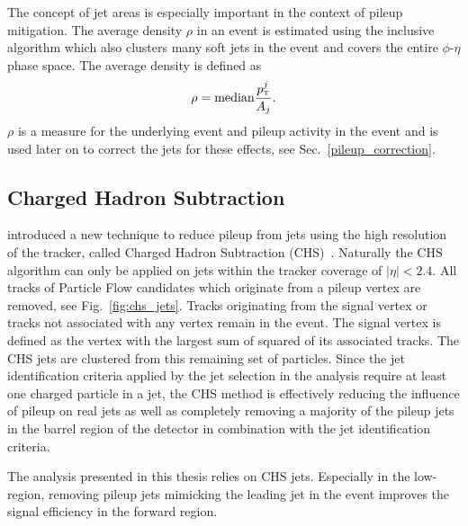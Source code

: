 The concept of jet areas is especially important in the context of pileup
mitigation. The average \pt density $\rho$ in an event is estimated using the inclusive
\kt algorithm which also clusters many soft jets in the event and covers the
entire $\phi$-$\eta$ phase space. The average \pt density is defined as
%
\begin{equation*}
    \rho = \text{median} \frac{\pt^j}{A_j}.
\end{equation*}
%
$\rho$ is a measure for the underlying event and pileup activity in the event
and is used later on to correct the jets for these effects, see
Sec.~\ref{pileup_correction}.

\subsection{Charged Hadron Subtraction}
\label{sec:chs_algorithm}

\CMS introduced a new technique to reduce pileup from jets using the high
resolution of the tracker, called Charged Hadron Subtraction
(CHS)~\cite{Kirschenmann:2014dla}. Naturally the CHS algorithm can only be
applied on jets within the tracker coverage of $|\eta| < 2.4$. All tracks of
Particle Flow candidates which originate from a pileup vertex are removed, see
Fig.~\ref{fig:chs_jets}. Tracks originating from the signal vertex or tracks not
associated with any vertex remain in the event. The signal vertex is defined as
the vertex with the largest sum of \pt squared of its associated tracks. The
CHS jets are clustered from this remaining set of particles. Since the jet
identification criteria applied by the jet selection in the analysis require at least
one charged particle in a jet, the CHS method is effectively reducing the
influence of pileup on real jets as well as completely removing a majority of
the pileup jets in the barrel region of the \CMS detector in combination with
the jet identification criteria.

The analysis presented in this thesis relies on CHS jets. Especially in the
low-\pt region, removing pileup jets mimicking the leading jet in the event
improves the signal efficiency in the forward region.

